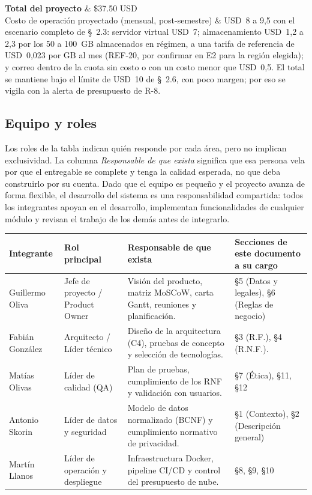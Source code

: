 \documentclass[10pt,a4paper]{article}
\newcommand{\hrow}{\rowcolor{encabezado}}
\newcommand{\h}[1]{\textbf{#1}}
\newenvironment{kv}[1][4.6cm]
  {\footnotesize\setlength{\extrarowheight}{3pt}\xltabular{\linewidth}{|E{#1}|L|}\hline}
  {\endxltabular}
\newcommand{\kvrow}[2]{#1 & #2 \\ \hline}
\begin{document}
\begin{kv}
\kvrow{\textbf{Total del proyecto}}{\$37.50 USD}
\kvrow{Costo de operación proyectado (mensual, post-semestre)}{USD~8 a 9,5 con el escenario completo de \S~2.3: servidor virtual USD~7; almacenamiento USD~1,2 a 2,3 por los 50 a 100~GB almacenados en régimen, a una tarifa de referencia de USD~0,023 por GB al mes (REF-20, por confirmar en E2 para la región elegida); y correo dentro de la cuota sin costo o con un costo menor que USD~0,5. El total se mantiene bajo el límite de USD~10 de \S~2.6, con poco margen; por eso se vigila con la alerta de presupuesto de R-8.}
\end{kv}

\subsection{Equipo y roles}
Los roles de la tabla indican quién responde por cada área, pero no implican exclusividad. La columna \emph{Responsable de que exista} significa que esa persona vela por que el entregable se complete y tenga la calidad esperada, no que deba construirlo por su cuenta. Dado que el equipo es pequeño y el proyecto avanza de forma flexible, el desarrollo del sistema es una responsabilidad compartida: todos los integrantes apoyan en el desarrollo, implementan funcionalidades
de cualquier módulo y revisan el trabajo de los demás antes de integrarlo.
\begin{xltabular}{\linewidth}{|P{3.6cm}|P{3.6cm}|L|P{3.8cm}|}
\hline\hrow \h{Integrante} & \h{Rol principal} & \h{Responsable de que exista} & \h{Secciones de este documento a su cargo} \\ \hline
\endhead
Guillermo Oliva & Jefe de proyecto / Product Owner & Visión del producto, matriz MoSCoW, carta Gantt, reuniones y planificación. & §5 (Datos y legales), §6 (Reglas de negocio) \\ \hline
Fabián González & Arquitecto / Líder técnico & Diseño de la arquitectura (C4), pruebas de concepto y selección de tecnologías. & §3 (R.F.), §4 (R.N.F.). \\ \hline
Matías Olivas & Líder de calidad (QA) & Plan de pruebas, cumplimiento de los RNF y validación con usuarios. & §7 (Ética), §11, §12 \\ \hline
Antonio Skorin & Líder de datos y seguridad & Modelo de datos normalizado (BCNF) y cumplimiento normativo de privacidad.  & §1 (Contexto), §2 (Descripción general) \\ \hline
Martín Llanos & Líder de operación y despliegue & Infraestructura Docker, pipeline CI/CD y control del presupuesto de nube. & §8, §9, §10 \\ \hline
\end{xltabular}
\end{document}

